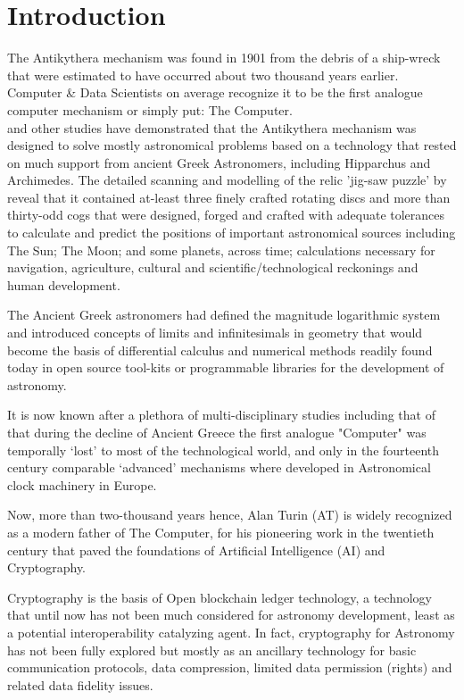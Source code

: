 \documentclass[final,5p,times,twocolumn,authoryear]{elsarticle}
\begin{document}
\section{Introduction}
\label{sec:intro}
%
 The Antikythera mechanism was found in 1901 from the debris of a ship-wreck that were estimated to have occurred about two thousand years earlier. Computer \& Data Scientists on average recognize it to be the first analogue computer mechanism or simply put: The Computer.\\ \citet{Freeth2021} and other studies have demonstrated that the Antikythera mechanism was designed to solve mostly astronomical problems based on a technology that rested on much support from ancient Greek Astronomers, including Hipparchus and Archimedes. The detailed scanning and modelling of the relic 'jig-saw puzzle' by \citet{Freeth2021} reveal that it contained at-least three finely crafted rotating discs and more than thirty-odd cogs that were designed, forged and crafted with adequate tolerances to calculate and predict the positions of important astronomical sources including The Sun; The Moon; and some planets, across time; calculations necessary for navigation, agriculture, cultural and scientific/technological reckonings and human development.
 
 The Ancient Greek astronomers had defined the magnitude logarithmic system and introduced concepts of limits and infinitesimals in geometry that would become the basis of differential calculus and numerical methods readily found today in open source tool-kits or programmable libraries for the development of astronomy.
 
 It is now known after a plethora of multi-disciplinary studies including that of \citet{Freeth2021} that during the decline of Ancient Greece the first analogue "Computer" was temporally `lost' to most of the technological world, and only in the fourteenth century comparable `advanced' mechanisms where developed in Astronomical clock machinery in Europe. 
 
 Now, more than two-thousand years hence, Alan Turin (AT) is widely recognized as a modern father of The Computer, for his pioneering  work in the twentieth century that paved the foundations of Artificial Intelligence (AI) and Cryptography. 
 
Cryptography is the basis of Open blockchain ledger technology, a technology that until now has not been much considered for astronomy development, least as a potential interoperability catalyzing agent. In fact, cryptography for Astronomy has not been fully explored but mostly as an ancillary technology for basic communication protocols,  data compression, limited data permission (rights) and related data fidelity issues.
\end{document}
